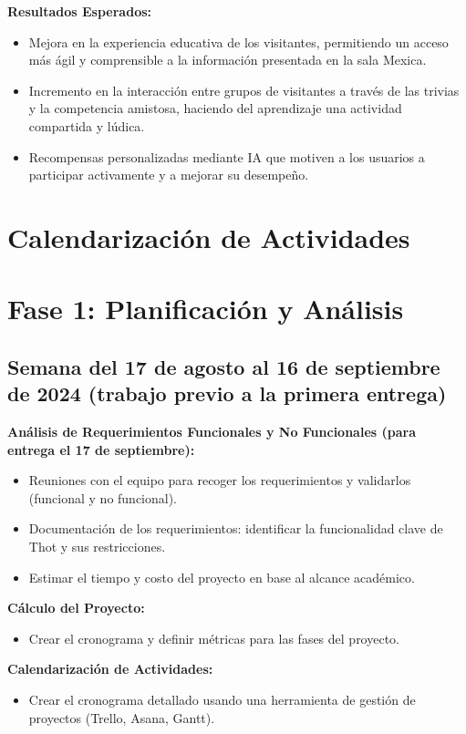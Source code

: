 \documentclass{report}
\begin{document}
    \textbf{Resultados Esperados:}
    \begin{itemize}
        \item Mejora en la experiencia educativa de los visitantes, permitiendo un acceso más ágil y comprensible a la información presentada en la sala Mexica.
        \item Incremento en la interacción entre grupos de visitantes a través de las trivias y la competencia amistosa, haciendo del aprendizaje una actividad compartida y lúdica.
        \item Recompensas personalizadas mediante IA que motiven a los usuarios a participar activamente y a mejorar su desempeño.
    \end{itemize}

    \newpage
    
    \section{Calendarización de Actividades}

    \section*{Fase 1: Planificación y Análisis}
    \subsection*{Semana del 17 de agosto al 16 de septiembre de 2024 (trabajo previo a la primera entrega)}
    \textbf{Análisis de Requerimientos Funcionales y No Funcionales (para entrega el 17 de septiembre):}
    \begin{itemize}
        \item Reuniones con el equipo para recoger los requerimientos y validarlos (funcional y no funcional).
        \item Documentación de los requerimientos: identificar la funcionalidad clave de Thot y sus restricciones.
        \item Estimar el tiempo y costo del proyecto en base al alcance académico.
    \end{itemize}
    \textbf{Cálculo del Proyecto:}
    \begin{itemize}
        \item Crear el cronograma y definir métricas para las fases del proyecto.
    \end{itemize}
    \textbf{Calendarización de Actividades:}
    \begin{itemize}
        \item Crear el cronograma detallado usando una herramienta de gestión de proyectos (Trello, Asana, Gantt).
    \end{itemize}
\end{document}
